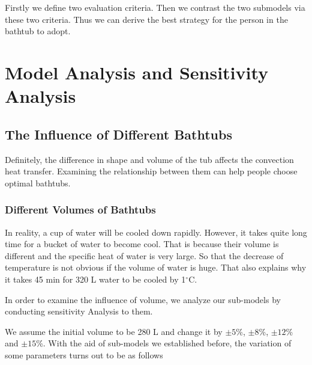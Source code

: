 \documentclass{mcmthesis}
\begin{document}
Firstly we define two evaluation criteria. Then we contrast the two submodels via these two criteria. Thus we can derive the best strategy for the person in the bathtub to adopt.

\section{Model Analysis and Sensitivity Analysis}

\subsection{The Influence of Different Bathtubs}

Definitely, the difference in shape and volume of the tub affects the
convection heat transfer. Examining the relationship between them can help
people choose optimal bathtubs.

\subsubsection{Different Volumes of Bathtubs}

In reality, a cup of water will be cooled down rapidly. However, it takes quite long time for a bucket of water to become cool. That is because their volume is different and the specific heat of water is very large. So that the decrease of temperature is not obvious if the volume of water is huge. That also explains why it takes 45 min for 320 L water to be cooled by 1$^\circ$C.

In order to examine the influence of volume, we analyze our sub-models
by conducting sensitivity Analysis to them.

We assume the initial volume to be 280 L and change it by $\pm 5$\%, $\pm 8$\%, $\pm 12$\% and $\pm 15$\%. With the aid of sub-models we established before, the variation of some parameters turns out to be as follows
\end{document}
